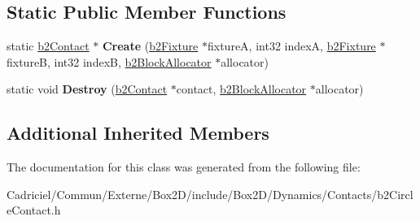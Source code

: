 \subsection*{Static Public Member Functions}
\begin{DoxyCompactItemize}
\item 
static \hyperlink{classb2_contact}{b2\+Contact} $\ast$ {\bfseries Create} (\hyperlink{classb2_fixture}{b2\+Fixture} $\ast$fixtureA, int32 indexA, \hyperlink{classb2_fixture}{b2\+Fixture} $\ast$fixtureB, int32 indexB, \hyperlink{classb2_block_allocator}{b2\+Block\+Allocator} $\ast$allocator)\hypertarget{classb2_circle_contact_a741c07fe3f626b80e01ff3d96cf2d90a}{}\label{classb2_circle_contact_a741c07fe3f626b80e01ff3d96cf2d90a}

\item 
static void {\bfseries Destroy} (\hyperlink{classb2_contact}{b2\+Contact} $\ast$contact, \hyperlink{classb2_block_allocator}{b2\+Block\+Allocator} $\ast$allocator)\hypertarget{classb2_circle_contact_a0171e991d568b7f4d8e5b4179072bf60}{}\label{classb2_circle_contact_a0171e991d568b7f4d8e5b4179072bf60}

\end{DoxyCompactItemize}
\subsection*{Additional Inherited Members}


The documentation for this class was generated from the following file\+:\begin{DoxyCompactItemize}
\item 
Cadriciel/\+Commun/\+Externe/\+Box2\+D/include/\+Box2\+D/\+Dynamics/\+Contacts/b2\+Circle\+Contact.\+h\end{DoxyCompactItemize}
